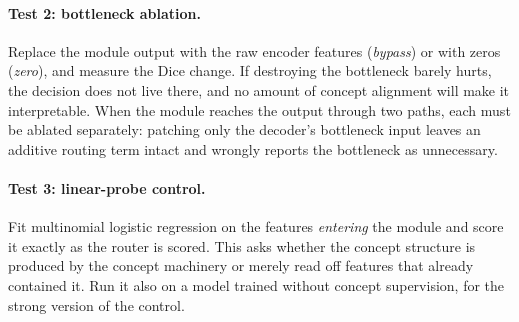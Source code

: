 \paragraph{Test 2: bottleneck ablation.}
Replace the module output with the raw encoder features (\emph{bypass}) or with zeros
(\emph{zero}), and measure the Dice change. If destroying the bottleneck barely hurts, the
decision does not live there, and no amount of concept alignment will make it interpretable. When
the module reaches the output through two paths, each must be ablated separately: patching only
the decoder's bottleneck input leaves an additive routing term intact and wrongly reports the
bottleneck as unnecessary.

\paragraph{Test 3: linear-probe control.}
Fit multinomial logistic regression on the features \emph{entering} the module and score it
exactly as the router is scored. This asks whether the concept structure is produced by the
concept machinery or merely read off features that already contained it. Run it also on a model
trained without concept supervision, for the strong version of the control.
